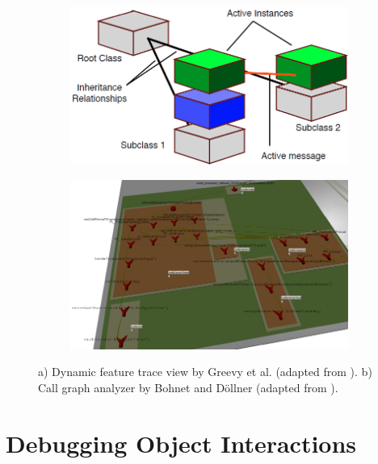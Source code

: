 \begin{figure}[tb]
	\centering
	
	\begin{subfigure}[b]{0.45\textwidth}
		\centering
        \includegraphics[width=\textwidth]{../images/06-Greevy-3D}
        \caption[Dynamic Feature Trace view by Greevy et al.]{}
		\label{fig:3DGreevy}
	\end{subfigure}
	\quad
	\begin{subfigure}[b]{0.45\textwidth}
		\centering
		\includegraphics[width=\textwidth]{../images/06-Bohnet-3D}
		\caption[Call Graph Analyzer by Bohnet and Döllner]{}
		\label{fig:3DBohnet}
	\end{subfigure}
	
	\caption[TOC Caption]{
		a) Dynamic feature trace view by Greevy et al. (adapted from \cite{greevy_visualizing_2006}).
		b) Call graph analyzer by Bohnet and Döllner (adapted from \cite{bohnet_visual_2006}).
	}
\end{figure}

\section{Debugging Object Interactions}

